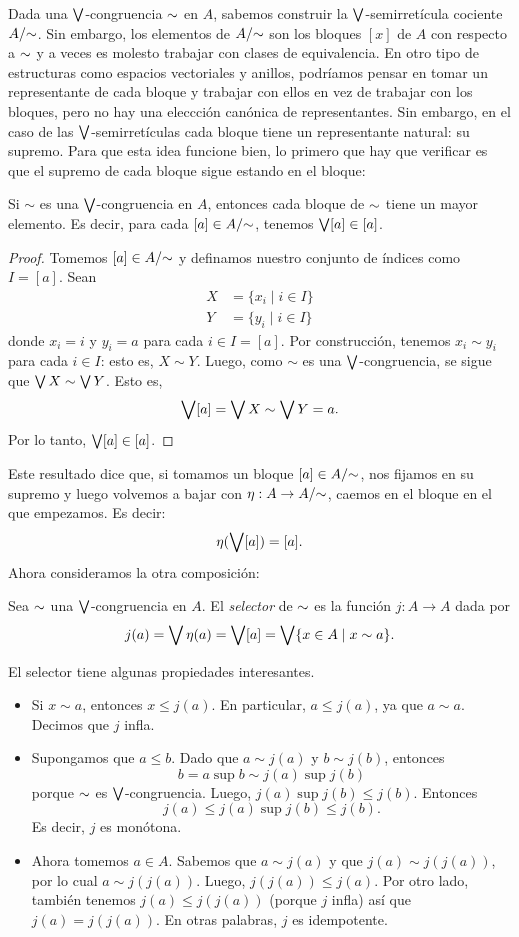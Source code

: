Dada una $\bigvee$-congruencia ${\sim}$ en $A$, sabemos construir la
$\bigvee$-semirretícula cociente $A/{\sim}$.
Sin embargo, los elementos de $A/{\sim}$ son los bloques $[x]$ de
$A$ con respecto a ${\sim}$ y a veces es molesto trabajar con
clases de equivalencia. En otro tipo de estructuras como espacios
vectoriales y anillos, podríamos pensar en tomar un representante
de cada bloque y trabajar con ellos en vez de trabajar con los
bloques, pero no hay una eleccción canónica de representantes.
Sin embargo, en el caso de las $\bigvee$-semirretículas cada bloque
tiene un representante natural: su supremo.
Para que esta idea funcione bien, lo primero que hay que
verificar es que el supremo de cada bloque sigue estando en el
bloque:
\begin{lemma}
  Si $\sim$ es una $\bigvee$-congruencia en $A$, entonces cada
  bloque de ${\sim}$ tiene un mayor elemento.
  Es decir, para cada $[a]\in A/{\sim}$, tenemos $\bigvee[a]\in [a]$.
\end{lemma}
\begin{proof}
  Tomemos $[a]\in A/{\sim}$ y definamos nuestro conjunto de
  índices como $I=[a]$.
  Sean
  \begin{align*}
      X &= \{x_i \mid i\in I\} \\
      Y &= \{y_i \mid i\in I\}
  \end{align*}
  donde $x_i=i$ y $y_i=a$ para cada $i\in I=[a]$.
  Por construcción, tenemos $x_i\sim y_i$ para cada $i\in I$:
  esto es, $X\sim Y$.
  Luego, como $\sim$ es una $\bigvee$-congruencia, se sigue que
  $\bigvee X\sim\bigvee Y$.
  Esto es,
  \[
      \bigvee[a] = \bigvee X \sim \bigvee Y = a
  .\]
  Por lo tanto, $\bigvee [a]\in [a]$.
\end{proof}
Este resultado dice que, si tomamos un bloque $[a]\in A/{\sim}$,
nos fijamos en su supremo y luego volvemos a bajar con $\eta:A\to
A/{\sim}$, caemos en el bloque en el que empezamos.
Es decir:
\[
    \eta(\bigvee [a]) = [a]
.\]
Ahora consideramos la otra composición:
\begin{defn}
    Sea ${\sim}$ una $\bigvee$-congruencia en $A$.
    El \emph{selector} de ${\sim}$ es la función $j:A\to A$ dada por
    \[
        j(a) = \bigvee\eta(a) = \bigvee[a] = \bigvee\{x\in A \mid x\sim a\}
    .\]
\end{defn}
El selector tiene algunas propiedades interesantes.
\begin{itemize}
    \item 
    Si $x\sim a$, entonces $x\leq j(a)$.
    En particular, $a\leq j(a)$, ya que $a\sim a$.
    Decimos que $j$ infla.
    \item
    Supongamos que $a\leq b$.
    Dado que $a\sim j(a)$ y $b\sim j(b)$, entonces
    \[
        b = a\sup b \sim j(a) \sup j(b)
    \]
    porque ${\sim}$ es $\bigvee$-congruencia.
    Luego, $j(a) \sup j(b) \leq j(b)$.
    Entonces
    \[
        j(a)\leq j(a)\sup j(b) \leq j(b)
    .\]
    Es decir, $j$ es monótona.
    \item
    Ahora tomemos $a\in A$.
    Sabemos que $a\sim j(a)$ y que $j(a)\sim j(j(a))$,
    por lo cual $a\sim j(j(a))$.
    Luego, $j(j(a))\leq j(a)$.
    Por otro lado, también tenemos $j(a)\leq j(j(a))$ (porque $j$ infla) así que
    $j(a)=j(j(a))$.
    En otras palabras, $j$ es idempotente.
\end{itemize}
